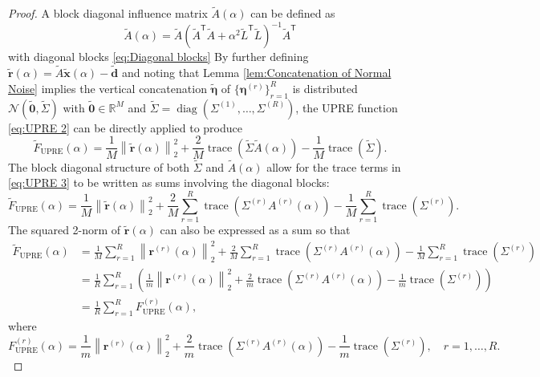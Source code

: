 \documentclass[12pt]{article}
\newcommand{\mA}{m}	%
\newcommand{\dVec}{\mathbf{d}}	%
\newcommand{\rVec}{\mathbf{r}}	%
\newcommand{\xVec}{\mathbf{x}}	%
\newcommand{\trans}[1]{{#1}^\mathsf{T}}	%
\DeclareMathOperator{\trace}{trace}		%
\DeclareMathOperator{\diag}{diag}	%
\newcommand{\regparam}{\alpha}  %
\newcommand{\rBig}{\widetilde{\rVec}}	%
\newcommand{\ABig}{\widetilde{A}}	%
\newcommand{\noise}{\eta}	%
\newcommand{\noiseVec}{\bm{\noise}}	%
\newcommand{\zeroVec}{\bm{0}}	%
\newcommand{\U}{F_{\text{UPRE}}}	%
\newcommand{\UBig}{\widetilde{F}_{\text{UPRE}}}	%
\begin{document}
\begin{proof}
A block diagonal influence matrix $\ABig(\regparam)$ can be defined as
\[\ABig(\regparam) = \ABig(\trans{\ABig}\ABig + \regparam^2\trans{\widetilde{L}}\widetilde{L})^{-1}\trans{\ABig}\]
with diagonal blocks \eqref{eq:Diagonal blocks}
By further defining $\rBig(\regparam) = \ABig\widetilde{\xVec}(\regparam) - \widetilde{\dVec}$ and noting that Lemma \ref{lem:Concatenation of Normal Noise} implies the vertical concatenation $\widetilde{\noiseVec}$ of $\{\noiseVec^{(r)}\}_{r=1}^R$ is distributed $\mathcal{N}(\widetilde{\zeroVec},\widetilde{\Sigma})$ with $\widetilde{\zeroVec} \in \mathbb{R}^M$ and $\widetilde{\Sigma} = \diag(\Sigma^{(1)},\ldots,\Sigma^{(R)})$, the UPRE function \eqref{eq:UPRE 2} can be directly applied to produce
\begin{equation}
\label{eq:UPRE 3}
\UBig(\regparam) = \frac{1}{M}\left\|\rBig(\regparam)\right\|_2^2 + \frac{2}{M}\trace\left(\widetilde{\Sigma}\ABig(\regparam)\right) - \frac{1}{M}\trace\left(\widetilde{\Sigma}\right).
\end{equation}
The block diagonal structure of both $\widetilde{\Sigma}$ and $\ABig(\regparam)$ allow for the trace terms in \eqref{eq:UPRE 3} to be written as sums involving the diagonal blocks:
\begin{equation}
\label{eq:UPRE 4}
\UBig(\regparam) = \frac{1}{M}\left\|\rBig(\regparam)\right\|_2^2 + \frac{2}{M} \sum_{r=1}^R \trace\left(\Sigma^{(r)}A^{(r)}(\regparam)\right) - \frac{1}{M} \sum_{r=1}^R \trace\left(\Sigma^{(r)}\right).
\end{equation}
The squared 2-norm of $\rBig(\regparam)$ can also be expressed as a sum so that
\begin{align*}
\UBig(\regparam) &= \frac{1}{M} \sum_{r=1}^R \left\|\rVec^{(r)}(\regparam)\right\|_2^2 + \frac{2}{M} \sum_{r=1}^R \trace\left(\Sigma^{(r)} A^{(r)}(\regparam)\right) - \frac{1}{M} \sum_{r=1}^R \trace\left(\Sigma^{(r)}\right) \\
&= \frac{1}{R} \sum_{r=1}^R \left(\frac{1}{\mA}\left\|\rVec^{(r)}(\regparam)\right\|_2^2 + \frac{2}{\mA} \trace\left(\Sigma^{(r)} A^{(r)}(\regparam)\right) - \frac{1}{\mA} \trace\left(\Sigma^{(r)}\right)\right) \\
&= \frac{1}{R} \sum_{r=1}^R \U^{(r)}(\regparam),
\end{align*}
where
\[\U^{(r)}(\regparam) = \frac{1}{\mA}\left\|\rVec^{(r)}(\regparam)\right\|_2^2 + \frac{2}{\mA} \trace\left(\Sigma^{(r)} A^{(r)}(\regparam)\right) - \frac{1}{\mA} \trace\left(\Sigma^{(r)}\right), \quad r = 1,\ldots,R.\]
\end{proof}
\end{document}
